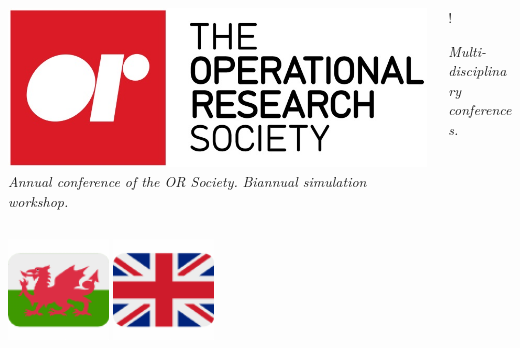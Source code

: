 \documentclass{beamer}
\begin{document}
\begin{frame}
  \begin{columns}
    \begin{column}{0.6\textwidth}
      \begin{center}
          \includegraphics[width=\textwidth]{theorsociety}
          \textit{Annual conference of the OR Society.}
          \textit{Biannual simulation workshop.}
        \end{center}
    \end{column}
    \begin{column}{0.4\textwidth}
      \begin{center}
        \resizebox {\columnwidth} {!} {
        }
        \textit{Multi-disciplinary conferences.}
      \end{center}
    \end{column}
  \end{columns}
  \vspace{7mm}
  \begin{center}
    \includegraphics[width=0.2\textwidth]{cy} \includegraphics[width=0.2\textwidth]{gb}\footnotemark
  \end{center}
\end{frame}
\end{document}
